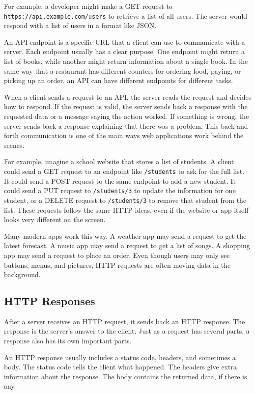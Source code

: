 For example, a developer might make a GET request to
\texttt{https://api.example.com/users} to retrieve a list of all
users. The server would respond with a list of users in a format like
JSON.

An API endpoint is a specific URL that a client can use to communicate
with a server. Each endpoint usually has a clear purpose. One endpoint
might return a list of books, while another might return information
about a single book. In the same way that a restaurant has different
counters for ordering food, paying, or picking up an order, an API can
have different endpoints for different tasks.

When a client sends a request to an API, the server reads the request
and decides how to respond. If the request is valid, the server sends
back a response with the requested data or a message saying the action
worked. If something is wrong, the server sends back a response
explaining that there was a problem. This back-and-forth communication
is one of the main ways web applications work behind the scenes.

For example, imagine a school website that stores a list of students.
A client could send a GET request to an endpoint like \texttt{/students}
to ask for the full list. It could send a POST request to the same
endpoint to add a new student. It could send a PUT request to
\texttt{/students/3} to update the information for one student, or a
DELETE request to \texttt{/students/3} to remove that student from the
list. These requests follow the same HTTP ideas, even if the website
or app itself looks very different on the screen.

Many modern apps work this way. A weather app may send a request to
get the latest forecast. A music app may send a request to get a list
of songs. A shopping app may send a request to place an order. Even
though users may only see buttons, menus, and pictures, HTTP requests
are often moving data in the background.


\subsection{HTTP Responses}

After a server receives an HTTP request, it sends back an HTTP
response. The response is the server's answer to the client. Just as a
request has several parts, a response also has its own important
parts.

An HTTP response usually includes a status code, headers, and
sometimes a body. The status code tells the client what happened. The
headers give extra information about the response. The body contains
the returned data, if there is any.

